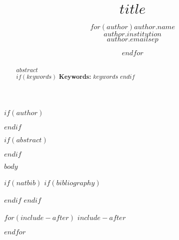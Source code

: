 \documentclass[notitlepage,12pt]{jedm}
\begin{document}
\title{$title$}
\date{} %

$if(author)$
\author{$for(author)${\large $author.name$}\\$author.institution$\\$author.email$$sep$ \and $endfor$}
$endif$

\maketitle

$if(abstract)$
\begin{abstract}
$abstract$\\ %

$if(keywords)$
{\parindent0pt
\textbf{Keywords:} $keywords$
}
$endif$
\end{abstract}
$endif$

$body$

$if(natbib)$
$if(bibliography)$

$endif$
$endif$

$for(include-after)$
$include-after$

$endfor$
\end{document}
